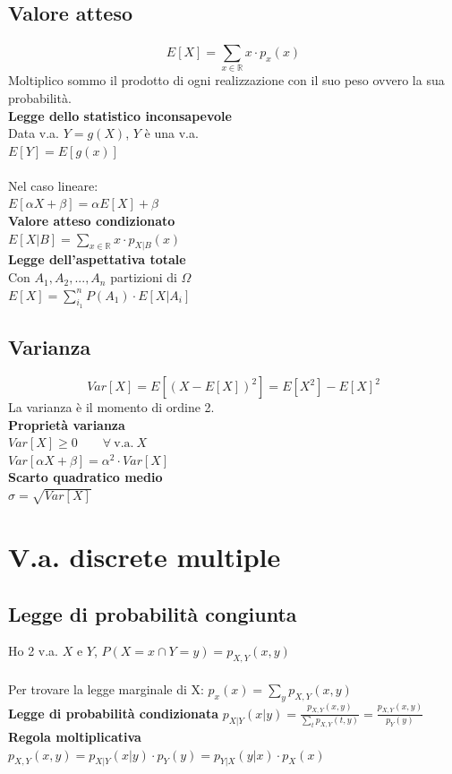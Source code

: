 \documentclass{article}
\begin{document}
\begin{multicols*}{3}
		
		
		
		
		
		\subsection{Valore atteso}
		\[E[X]= \sum_{x\in \mathbb{R}}^{} x \cdot p_x(x)\]
		Moltiplico sommo il prodotto di ogni realizzazione con il suo peso ovvero la sua probabilità.\\
		\textbf{Legge dello statistico inconsapevole}\\
		Data v.a. \(Y= g(X)\), \(Y\) è una v.a.\\
		\(E[Y]= E[g(x)]\)\\\\
		Nel caso lineare:\\
		\(E[\alpha X + \beta] = \alpha E[X] + \beta\)\\
		\textbf{Valore atteso condizionato}\\
		\(E[X|B]= \sum_{x\in \mathbb{R}}^{} x \cdot p_{X|B} (x) \)\\
		\textbf{Legge dell'aspettativa totale}\\
		Con \(A_1,A_2,...,A_n\) partizioni di \(\Omega\)\\
		\(E[X] = \sum_{i_1}^{n} P(A_1) \cdot E[X|A_i]\)
		
		\subsection{Varianza}
		\[Var[X] = E[(X-E[X])^2] = E[X^2]- E[X]^2\]
		La varianza è il momento di ordine 2.\\
		\textbf{Proprietà varianza}\\
		\(Var[X] \geq 0 \qquad \forall \ \text{v.a.} \ X\)\\
		\(Var[\alpha X + \beta] = \alpha^2 \cdot Var[X]\)\\
		\textbf{Scarto quadratico medio}\\
		\(\sigma = \sqrt{Var[X]}\)\\
		\section{V.a. discrete multiple}
		\subsection{Legge di probabilità congiunta}
		Ho 2 v.a. \(X\) e \(Y\), \(P({X=x}\cap{Y=y}) = p_{X,Y} (x,y) \)\\\\
		Per trovare la legge marginale di X: \(p_x (x) = \sum_{y}^{} p_{X,Y} (x,y)\)\\
		\textbf{Legge di probabilità condizionata}
		\(p_{X|Y} (x|y) = \frac{p_{X,Y} (x,y)}{\sum_{t}^{} p_{X,Y} (t,y)} = \frac{p_{X,Y} (x,y)}{p_Y (y)}\)\\
		\textbf{Regola moltiplicativa}\\
		\(p_{X,Y} (x,y) = p_{X|Y} (x|y) \cdot p_Y (y) = p_{Y|X} (y|x) \cdot p_X (x)\)\\

\end{multicols*}
\end{document}
